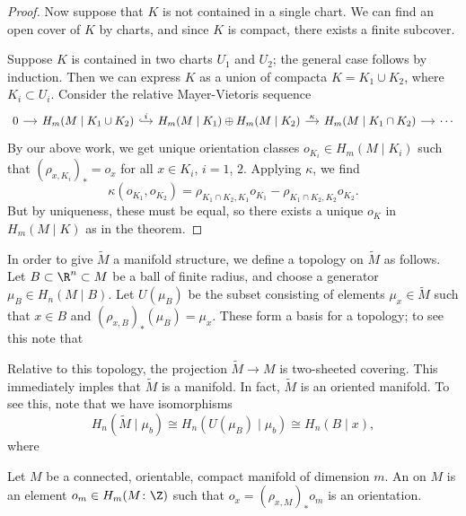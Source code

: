 \documentclass[main.tex]{subfiles}
\begin{document}
\begin{proof}
  Now suppose that \(K\) is not contained in a single chart. We can find an open cover of \(K\) by charts, and since \(K\) is compact, there exists a finite subcover.

  Suppose \(K\) is contained in two charts \(U_{1}\) and \(U_{2}\); the general case follows by induction. Then we can express \(K\) as a union of compacta \(K =  K_{1} \cup K_{2}\), where \(K_{i} \subset U_{i} \). Consider the relative Mayer-Vietoris sequence
  \begin{equation*}
    \begin{tikzcd}[column sep=small]
      0
      \arrow[r]
      & H_{m}(M\mid K_{1} \cup K_{2})
      \arrow[r, hook, "i"]
      & H_{m}(M\mid K_{1}) \oplus H_{m}(M\mid K_{2})
      \arrow[r, "\kappa"]
      & H_{m}(M\mid K_{1} \cap K_{2})
      \arrow[r]
      & \cdots
    \end{tikzcd}
  \end{equation*}
  By our above work, we get unique orientation classes \(o_{K_{i}} \in H_{m}(M \mid K_{i})\) such that \((\rho_{x, K_{i}})_{*} = o_{x}\) for all \(x \in K_{i}\), \(i = 1\), \(2\). Applying \(\kappa\), we find
  \begin{equation*}
    \kappa(o_{K_{1}}, o_{K_{2}}) = \rho_{K_{1} \cap K_{2}, K_{1}}o_{K_{1}} - \rho_{K_{1} \cap K_{2}, K_{2}}o_{K_{2}}.
  \end{equation*}
  But by uniqueness, these must be equal, so there exists a unique \(o_{K}\) in \(H_{m}(M \mid K)\) as in the theorem.
\end{proof}


In order to give \(\tilde{M}\) a manifold structure, we define a topology on \(\tilde{M}\) as follows. Let \(B \subset \R^{n} \subset M\) be a ball of finite radius, and choose a generator \(\mu_{B} \in H_{n}(M \mid B)\). Let \(U(\mu_{B})\) be the subset consisting of elements \(\mu_{x} \in \tilde{M}\) such that \(x \in B\) and \((\rho_{x,B})_{*}(\mu_{B}) = \mu_{x}\). These form a basis for a topology; to see this note that

Relative to this topology, the projection \(\tilde{M} \to M\) is two-sheeted covering. This immediately imples that \(\tilde{M}\) is a manifold. In fact, \(\tilde{M}\) is an oriented manifold. To see this, note that we have isomorphisms
\begin{equation*}
  H_{n}(\tilde{M} \mid \mu_{b}) \cong H_{n}(U(\mu_{B}) \mid \mu_{b}) \cong H_{n}(B \mid x),
\end{equation*}
where


\begin{definition}
  \label{def:orientation_class}
  Let \(M\) be a connected, orientable, compact manifold of dimension \(m\). An  on \(M\) is an element \(o_{m} \in H_{m}(M\colon \Z)\) such that \(o_{x} = (\rho_{x, M})_{*} o_{m}\)  is an orientation.
\end{definition}
\end{document}
